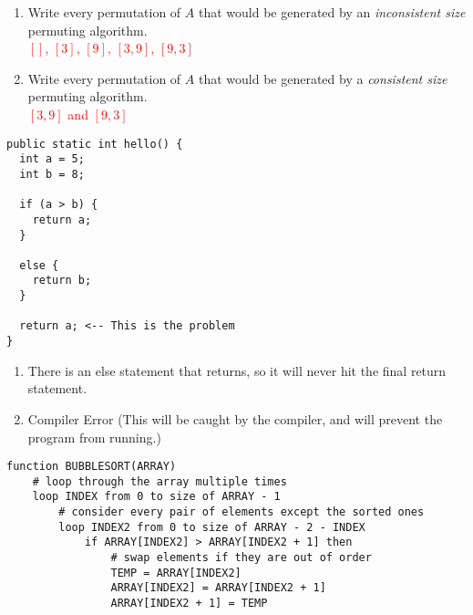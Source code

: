 \documentclass[11pt,addpoints]{exam}
\begin{document}
\begin{questions}


\begin{enumerate}[label=(\Alph*)]
  \item Write every permutation of $A$ that would be generated by an \textit{inconsistent size} permuting algorithm. \\

  \textcolor{red}{$[]$, $[3]$, $[9]$, $[3, 9]$, $[9, 3]$}


  \item Write every permutation of $A$ that would be generated by a \textit{consistent size} permuting algorithm. \\
   
  \textcolor{red}{$[3,9]$ and $[9,3]$}

\end{enumerate}

\begin{minipage}{\textwidth}

\begin{verbatim}
public static int hello() {
  int a = 5;
  int b = 8;

  if (a > b) {
    return a;
  }

  else {
    return b;
  }

  return a; <-- This is the problem
}
\end{verbatim}

\begin{enumerate}[label=(\alph*)]
  \item There is an else statement that returns, so it will never hit the final return statement.
  \item Compiler Error (This will be caught by the compiler, and will prevent the program from running.)
\end{enumerate}

\end{minipage}


\begin{verbatim}
function BUBBLESORT(ARRAY)							            
    # loop through the array multiple times
    loop INDEX from 0 to size of ARRAY - 1					    
        # consider every pair of elements except the sorted ones
        loop INDEX2 from 0 to size of ARRAY - 2 - INDEX			
            if ARRAY[INDEX2] > ARRAY[INDEX2 + 1] then			
                # swap elements if they are out of order
                TEMP = ARRAY[INDEX2]						    
                ARRAY[INDEX2] = ARRAY[INDEX2 + 1]				
                ARRAY[INDEX2 + 1] = TEMP					    
\end{verbatim}


\end{questions}
\end{document}
